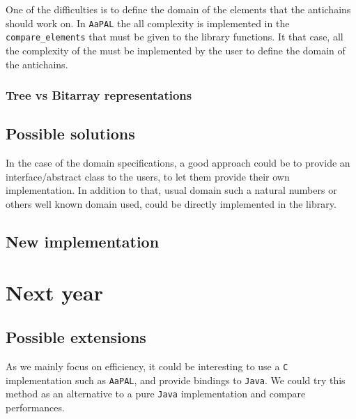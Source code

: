 \documentclass[letterpaper]{article}
\begin{document}

One of the difficulties is to define the domain of the elements that
the antichains should work on. In \texttt{AaPAL} the all complexity
is implemented in the \texttt{compare\_elements} that must be given
to the library functions. It that case, all the complexity of the
must be implemented by the user to define the domain of the antichains.

\subsubsection{Tree vs Bitarray representations}


\subsection{Possible solutions}

In the case of the domain specifications, a good approach could be to
provide an interface/abstract class to the users, to let them provide
their own implementation. In addition to that, usual domain such a
natural numbers or others well known domain used, could be directly implemented
in the library.


\subsection{New implementation}


\section{Next year}

\label{conclusion}


\subsection{Possible extensions}


As we mainly focus on efficiency, it could be interesting to use a \texttt{C}
implementation such as \texttt{AaPAL},
and provide bindings to \texttt{Java}. We could try
this method as an alternative to a pure \texttt{Java} implementation and
compare performances.





\end{document}
